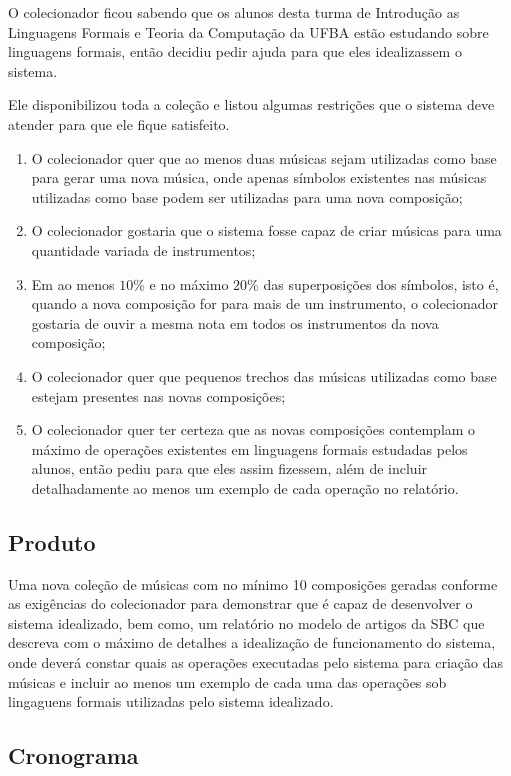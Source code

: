 O colecionador ficou sabendo que os alunos desta turma de Introdução as Linguagens Formais
e Teoria da Computação da UFBA estão estudando sobre linguagens formais, então decidiu pedir
ajuda para que eles idealizassem o sistema.

Ele disponibilizou toda a coleção e listou algumas restrições que o sistema
deve atender para que ele fique satisfeito.

\begin{enumerate}
\item O colecionador quer que ao menos duas músicas sejam utilizadas como base para gerar uma nova música,
onde apenas símbolos existentes nas músicas utilizadas como base podem ser utilizadas para uma nova composição;
\item O colecionador gostaria que o sistema fosse capaz de criar músicas para uma quantidade variada de instrumentos;
\item Em ao menos $10\%$ e no máximo $20\%$ das superposições dos símbolos, isto é, quando a nova composição for para mais de um instrumento,
o colecionador gostaria de ouvir a mesma nota em todos os instrumentos da nova composição;
\item O colecionador quer que pequenos trechos das músicas utilizadas como base estejam
presentes nas novas composições;
\item O colecionador quer ter certeza que as novas composições contemplam o máximo
de operações existentes em linguagens formais estudadas pelos alunos, então pediu para
que eles assim fizessem, além de incluir detalhadamente ao menos um exemplo de cada operação
no relatório.
\end{enumerate}

\subsection{Produto}
Uma nova coleção de músicas com no mínimo 10 composições geradas conforme as exigências do colecionador
para demonstrar que é capaz de desenvolver o sistema idealizado, bem como, um relatório no modelo de
artigos da SBC que descreva com o máximo de detalhes a idealização de funcionamento do sistema, onde deverá
constar quais as operações executadas pelo sistema para criação das músicas e incluir ao menos
um exemplo de cada uma das operações sob lingaguens formais utilizadas pelo sistema idealizado.

\subsection{Cronograma}

